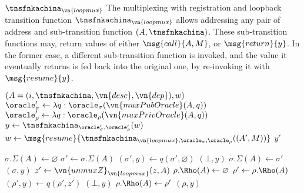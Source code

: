 \begin{transitionfn}{$\tnsfnkachina_{\vn{loopmux}}$}
  The multiplexing with registration and loopback transition function
  $\tnsfnkachina_{\vn{loopmux}}$ allows addressing any pair of address and
  sub-transition function $(A, \tnsfnkachina)$. These sub-transition functions may,
  return values of either $\msg{call}{A, M}$, or $\msg{return}{y}$. In the
  former case, a different sub-transition function is invoked, and the value it
  eventually returns is fed back into the original one, by re-invoking it with
  $\msg{resume}{y}$.

  \begin{pubstatedecl}
  \end{pubstatedecl}%
  \vspace{-1em}
  \begin{privstatedecl}
  \end{privstatedecl}

  \begin{receiveinput*}{$(A = (i, \tnsfnkachina, \vn{desc}, \vn{dep}), w)$}
    \State \Let $\oracle_\sigma' \gets \lambda q :
      \oracle_\sigma(\vn{muxPubOracle}(A, q))$
    \State \Let $\oracle_\rho' \gets \lambda q :
      \oracle_\rho(\vn{muxPrivOracle}(A, q))$
    \Repeat
      \State \Let $y \gets \tnsfnkachina_{\oracle_\sigma', \oracle_\rho'}(w)$
        \State \Let $w \gets
          \msg{resume}{\tnsfnkachina_{\vn{loopmux},\oracle_\sigma,\oracle_\rho}((A', M))}$
      \EndIf
    \State \Return $y'$
  \end{receiveinput*}

  \begin{helpers}
        \Let $\sigma.\Sigma(A) \gets \varnothing$
      \EndIf
      \State \Let $\sigma' \gets \sigma.\Sigma(A)$
      \State \Let $(\sigma', y) \gets q(\sigma', \varnothing)$
        \Return $(\bot, y)$
      \Else
        \State \Let $\sigma.\Sigma(A) \gets \sigma'$
        \State \Return $(\sigma, y)$
      \EndIf
    \EndFunction
      \State \Let $z' \gets \vn{unmuxZ}_{\vn{loopmux}}(z, A)$
        \Let $\rho.\Rho(A) \gets \varnothing$
      \EndIf
      \State \Let $\rho' \gets \rho.\Rho(A)$
      \State \Let $(\rho', y) \gets q(\rho', z')$
        \Return $(\bot, y)$
      \Else
        \State \Let $\rho.\Rho(A) \gets \rho'$
        \State \Return $(\rho, y)$
      \EndIf
    \EndFunction
  \end{helpers}
\end{transitionfn}


